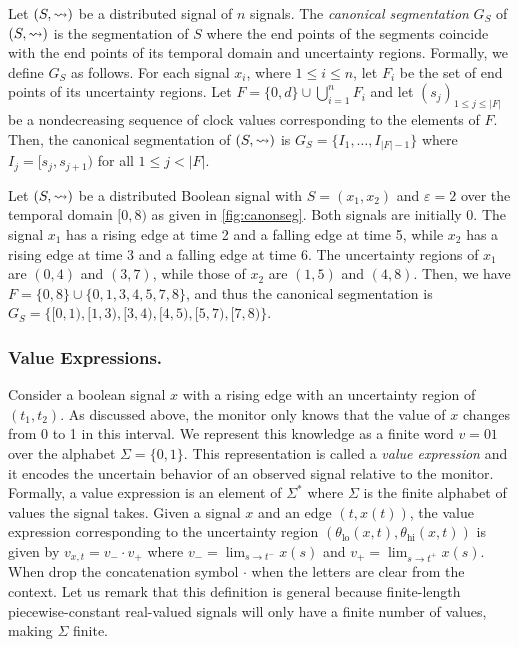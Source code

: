 Let $(S,{\rightsquigarrow})$ be a distributed signal of $n$ signals.
The \emph{canonical segmentation} $G_S$ of $(S,{\rightsquigarrow})$ is the segmentation of $S$ where the end points of the segments coincide with the end points of its temporal domain and uncertainty regions.
Formally, we define $G_S$ as follows.
For each signal $x_i$, where $1 \leq i \leq n$, let $F_i$ be the set of end points of its 
uncertainty regions.
%
Let $F = \{0, d\} \cup \bigcup_{i = 1}^{n} F_i$ and let $(s_j)_{1 
\leq j \leq |F|}$ be a nondecreasing sequence of clock values corresponding to the elements of $F$.
Then, the canonical segmentation of $(S,{\rightsquigarrow})$ is $G_S = \{I_1, \ldots, I_{|F| - 1}\}$ where $I_j = [s_j, s_{j+1})$ for all $1 \leq j < |F|$.



\begin{example} \label{ex:canonseg}
	Let $(S, {\rightsquigarrow})$ be a distributed Boolean signal with $S = (x_1, x_2)$ and $\varepsilon = 2$ over 
	the temporal domain $[0,8)$ as given in \cref{fig:canonseg}.
	Both signals are initially 0.
	The signal $x_1$ has a rising edge at time 2 and a falling edge at time 5, while $x_2$ has a rising edge at time 3 and a falling edge at time 6.
	The uncertainty regions of $x_1$ are $(0,4)$ and $(3,7)$, while those of $x_2$ are $(1,5)$ and $(4,8)$.
	Then, we have $F = \{0, 8\} \cup \{0, 1, 3, 4, 5, 7, 8\}$, and thus the canonical segmentation is $G_S = \{ [0,1), [1,3), [3,4), [4,5), [5,7), [7,8) \}$.
\end{example}




\subsubsection{Value Expressions.}
Consider a boolean signal $x$ with a rising edge with an uncertainty region of $(t_1, t_2)$.
As discussed above, the monitor only knows that the value of $x$ changes from 0 to 1 in this interval.
We represent this knowledge as a finite word $v = 01$ over the alphabet $\Sigma = \{0,1\}$.
This representation is called a \emph{value expression} and it encodes the uncertain behavior of an observed signal relative to the monitor.
Formally, a value expression is an element of $\Sigma^*$ where $\Sigma$ is the finite alphabet of values the signal takes.
Given a signal $x$ and an edge $(t, x(t))$, the value expression corresponding to the uncertainty region $(\theta_{\text{lo}}(x,t), \theta_{\text{hi}}(x,t))$ is given by $v_{x,t} = v_- \cdot v_+$ where $v_- = \lim_{s \to t^-} x(s)$ and $v_+ = \lim_{s \to t^+} x(s)$.
When drop the concatenation symbol $\cdot$ when the letters are clear from the context.
Let us remark that this definition is general because finite-length piecewise-constant real-valued signals will only have a finite number of values, making $\Sigma$ finite.

